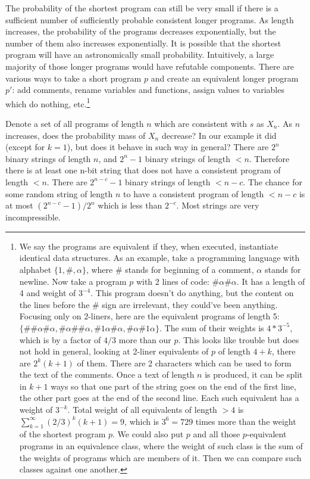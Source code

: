 The probability of the shortest program can still be very small if there is a sufficient number of sufficiently probable consistent longer programs.
As length increases, the probability of the programs decreases exponentially, but the number of them also increases exponentially.
It is possible that the shortest program will have an astronomically small probability.
Intuitively, a large majority of those longer programs would have refutable components. 
There are various ways to take a short program $p$ and create an equivalent longer program $p'$: add comments, rename variables and functions, assign values to variables which do nothing, etc.\footnote{
We say the programs are equivalent if they, when executed, instantiate identical data structures.
As an example, take a programming language with alphabet $\{1,\#,\alpha\}$, where \# stands for beginning of a comment, $\alpha$ stands for newline.
Now take a program $p$ with 2 lines of code: $\#\alpha\#\alpha$.
It has a length of 4 and weight of $3^{-4}$.
This program doesn't do anything, but the content on the lines before the \# sign are irrelevant, they could've been anything.
Focusing only on 2-liners, here are the equivalent programs of length 5: $\{\#\#\alpha\#\alpha, \#\alpha\#\#\alpha, \#1\alpha\#\alpha, \#\alpha\#1\alpha\}$.
The sum of their weights is $4 * 3^{-5}$, which is by a factor of $4/3$ more than our $p$.
This looks like trouble but does not hold in general, looking at 2-liner equivalents of $p$ of length $4+k$, there are $2^k(k+1)$ of them.
There are 2 characters which can be used to form the text of the comments.
Once a text of length $n$ is produced, it can be split in $k+1$ ways so that one part of the string goes on the end of the first line, the other part goes at the end of the second line.
Each such equivalent has a weight of $3^{-k}$.
Total weight of all equivalents of length $>4$ is $\sum_{k=1}^{\infty} (2/3)^k(k+1) = 9$, which is $3^6 = 729$ times more than the weight of the shortest program $p$.
We could also put $p$ and all those $p$-equivalent programs in an equivalence class, where the weight of such class is the sum of the weights of programs which are members of it.
Then we can compare such classes against one another.
}

Denote a set of all programs of length $n$ which are consistent with $s$ as $X_n$.
As $n$ increases, does the probability mass of $X_n$ decrease?
In our example it did (except for $k=1$), but does it behave in such way in general?
There are $2^n$ binary strings of length $n$, and $2^n-1$ binary strings of length $<n$.
Therefore there is at least one n-bit string that does not have a consistent program of length $<n$.
There are $2^{n-c}-1$ binary strings of length $<n-c$.
The chance for some random string of length $n$ to have a consistent program of length $<n-c$ is at most $(2^{n-c}-1)/2^n$ which is less than $2^{-c}$.
Most strings are very incompressible.

